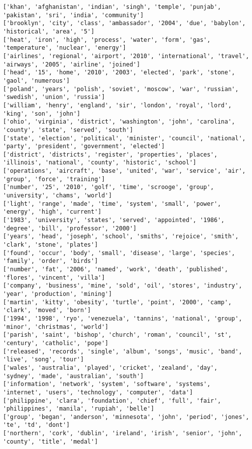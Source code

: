 \documentclass[11pt]{ctexart}
\begin{document}
\begin{Verbatim}[commandchars=\\\{\}]
['khan', 'afghanistan', 'indian', 'singh', 'temple', 'punjab', 'pakistan', 'sri', 'india', 'community']
['brooklyn', 'city', 'class', 'ambassador', '2004', 'due', 'babylon', 'historical', 'area', '5']
['heat', 'iron', 'high', 'process', 'water', 'form', 'gas', 'temperature', 'nuclear', 'energy']
['airlines', 'regional', 'airport', '2010', 'international', 'travel', 'airways', '2005', 'airline', 'joined']
['head', '15', 'home', '2010', '2003', 'elected', 'park', 'stone', 'gaol', 'numerous']
['poland', 'years', 'polish', 'soviet', 'moscow', 'war', 'russian', 'swedish', 'union', 'russia']
['william', 'henry', 'england', 'sir', 'london', 'royal', 'lord', 'king', 'son', 'john']
['ohio', 'virginia', 'district', 'washington', 'john', 'carolina', 'county', 'state', 'served', 'south']
['state', 'election', 'political', 'minister', 'council', 'national', 'party', 'president', 'government', 'elected']
['district', 'districts', 'register', 'properties', 'places', 'illinois', 'national', 'county', 'historic', 'school']
['operations', 'aircraft', 'base', 'united', 'war', 'service', 'air', 'group', 'force', 'training']
['number', '25', '2010', 'golf', 'time', 'scrooge', 'group', 'university', 'chams', 'world']
['light', 'range', 'made', 'time', 'system', 'small', 'power', 'energy', 'high', 'current']
['1983', 'university', 'states', 'served', 'appointed', '1986', 'degree', 'bill', 'professor', '2000']
['years', 'head', 'joseph', 'school', 'smiths', 'rejoice', 'smith', 'clark', 'stone', 'plates']
['found', 'occur', 'body', 'small', 'disease', 'large', 'species', 'family', 'order', 'birds']
['number', 'fat', '2006', 'named', 'work', 'death', 'published', 'flores', 'vincent', 'villa']
['company', 'business', 'mine', 'sold', 'oil', 'stores', 'industry', 'year', 'production', 'mining']
['martin', 'kitty', 'obesity', 'turtle', 'point', '2000', 'camp', 'clark', 'moved', 'born']
['1994', '1998', 'ryo', 'venezuela', 'tannins', 'national', 'group', 'minor', 'christmas', 'world']
['parish', 'saint', 'bishop', 'church', 'roman', 'council', 'st', 'century', 'catholic', 'pope']
['released', 'records', 'single', 'album', 'songs', 'music', 'band', 'live', 'song', 'tour']
['wales', 'australia', 'played', 'cricket', 'zealand', 'day', 'sydney', 'made', 'australian', 'south']
['information', 'network', 'system', 'software', 'systems', 'internet', 'users', 'technology', 'computer', 'data']
['philippine', 'clara', 'foundation', 'chief', 'full', 'fair', 'philippines', 'manila', 'rupiah', 'belle']
['group', 'began', 'anderson', 'minnesota', 'john', 'period', 'jones', 'te', 'td', 'dont']
['northern', 'cork', 'dublin', 'ireland', 'irish', 'senior', 'john', 'county', 'title', 'medal']

\end{Verbatim}
\end{document}
